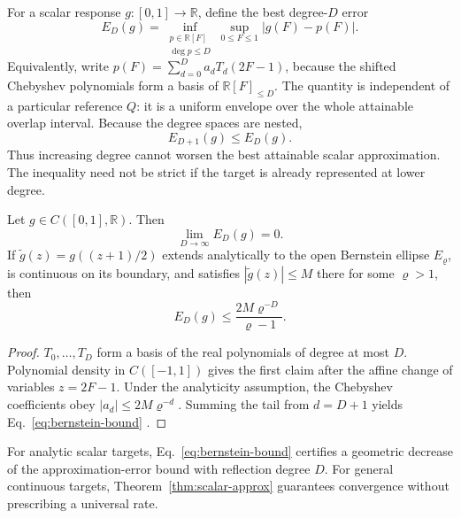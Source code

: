 \documentclass[pdflatex,sn-mathphys,NameDate,iicol]{sn-jnl}
\newcommand{\R}{\mathbb{R}}
\begin{document}
For a scalar response $g:[0,1]\to\R$, define the best degree-$D$ error
\begin{equation}
  E_D(g)
  =
  \inf_{\substack{p\in\R[F]\\\deg p\le D}}
  \sup_{0\le F\le1}
  \left|g(F)-p(F)\right|.
  \label{eq:best-scalar-error}
\end{equation}
Equivalently, write
$p(F)=\sum_{d=0}^{D}a_dT_d(2F-1)$, because the shifted Chebyshev
polynomials form a basis of $\R[F]_{\le D}$.
The quantity is independent of a particular reference $Q$: it is a uniform
envelope over the whole attainable overlap interval. Because the degree
spaces are nested,
\begin{equation}
  E_{D+1}(g)\le E_D(g).
  \label{eq:best-error-monotone}
\end{equation}
Thus increasing degree cannot worsen the best attainable scalar
approximation. The inequality need not be strict if the target is already
represented at lower degree.

\begin{theorem}
\label{thm:scalar-approx}
Let $g\in C([0,1],\R)$. Then
\begin{equation}
  \lim_{D\to\infty}E_D(g)=0.
\end{equation}
If $\widetilde g(z)=g((z+1)/2)$ extends analytically to the open Bernstein
ellipse $E_\varrho$, is continuous on its boundary, and satisfies
$|\widetilde g(z)|\le M$ there for some $\varrho>1$, then
\begin{equation}
  E_D(g)
  \le
  \frac{2M\varrho^{-D}}{\varrho-1}.
  \label{eq:bernstein-bound}
\end{equation}
\end{theorem}

\begin{proof}
$T_0,\ldots,T_D$ form a basis of the real polynomials of degree at most
$D$. Polynomial density in $C([-1,1])$ gives the first claim after the
affine change of variables $z=2F-1$. Under the analyticity assumption, the
Chebyshev coefficients obey $|a_d|\le2M\varrho^{-d}$. Summing the tail from
$d=D+1$ yields Eq.~\eqref{eq:bernstein-bound}
\citep{trefethen2019approximation}.
\end{proof}

For analytic scalar targets, Eq.~\eqref{eq:bernstein-bound} certifies a
geometric decrease of the approximation-error bound with reflection degree
$D$. For general continuous targets, Theorem~\ref{thm:scalar-approx}
guarantees convergence without prescribing a universal rate.
\end{document}
